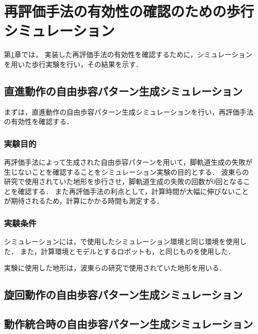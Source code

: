 ﻿

\chapter{再評価手法の有効性の確認のための歩行シミュレーション}\label{chapter:再評価手法の有効性の確認のための歩行シミュレーション}
第\ref{chapter:再評価手法の有効性の確認のための歩行シミュレーション}章では，
実装した再評価手法の有効性を確認するために，シミュレーションを用いた歩行実験を行い，その結果を示す．

\section{直進動作の自由歩容パターン生成シミュレーション}
まずは，直進動作の自由歩容パターン生成シミュレーションを行い，再評価手法の有効性を確認する．

\subsection{実験目的}
再評価手法によって生成された自由歩容パターンを用いて，脚軌道生成の失敗が生じないことを確認することをシミュレーション実験の目的とする．
波東らの研究で使用されていた地形を歩行させ，脚軌道生成の失敗の回数が0回となることを確認する．
また再評価手法の利点として，計算時間が大幅に伸びないことが期待されるため，計算にかかる時間も測定する．

\subsection{実験条件}
シミュレーションには，で使用したシミュレーション環境と同じ環境を使用した．
また，計算環境とモデルとするロボットも，と同じものを使用した．

実験に使用した地形は，波東らの研究で使用されていた地形を用いる．

\section{旋回動作の自由歩容パターン生成シミュレーション}

\section{動作統合時の自由歩容パターン生成シミュレーション}
